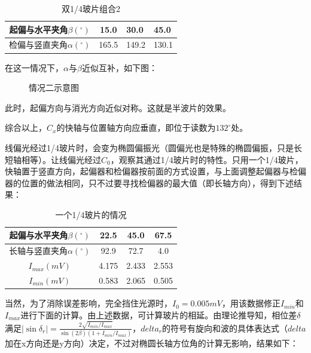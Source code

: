 \documentclass[12pt]{article}
\begin{document}
\begin{table}[H]
    \centering
    \begin{tabular}{|c|c|l|l|}
    \hline
    起偏与水平夹角$\beta (^\circ)$  & 15.0  & 30.0  & 45.0  \\ \hline
    检偏与竖直夹角$\alpha (^\circ)$ & 165.5 & 149.2 & 130.1 \\ \hline
    \end{tabular}
    \caption{双1/4玻片组合2}
    \label{tab:A4}
\end{table}

在这一情况下，$\alpha$与$\beta$近似互补，如下图：

\begin{figure}[H]
    \centering
    
    \caption{情况二示意图}
    \label{fig:3}
\end{figure}

此时，起偏方向与消光方向近似对称。这就是半波片的效果。

综合以上，$C_x$的快轴与位置轴方向应垂直，即位于读数为$132^\circ$处。

线偏光经过1/4玻片时，会变为椭圆偏振光（圆偏光也是特殊的椭圆偏振，只是长短轴相等）。让线偏光经过$C_0$，观察其通过1/4玻片时的特性。只用一个1/4玻片，快轴置于竖直方向，起偏器和检偏器按前面的方式设置，与上面调整起偏器与检偏器的位置的做法相同，只不过要寻找检偏器的最大值（即长轴方向），得到下述结果：

\begin{table}[H]
    \centering
    \begin{tabular}{|c|c|c|c|}
    \hline
    起偏与水平夹角$\beta (^\circ)$  & 22.5  & 45.0  & 67.5  \\ \hline
    长轴与竖直夹角$\alpha (^\circ)$ & 92.9  & 72.7  & 4.0   \\ \hline
    $I_{max}(mV)$            & 4.175 & 2.433 & 2.553 \\ \hline
    $I_{min}(mV)$            & 0.583 & 2.065 & 0.505 \\ \hline
    \end{tabular}
    \caption{一个1/4玻片的情况}
    \label{tab:A5}
\end{table}

当然，为了消除误差影响，完全挡住光源时，$I_0=0.005mV$，用该数据修正$I_{min}$和$I_{max}$进行下面的计算。由上述数据，可计算玻片的相延。由理论推导知，相位差$\delta$满足$|\sin{\delta_r}|=\frac{2\sqrt{I_{min}/I_{max}}}{\sin{(2\beta)}(1+I_{min}/I_{max})}$，$delta_r$的符号有旋向和波的具体表达式（$delta$加在x方向还是y方向）决定，不过对椭圆长轴方位角的计算无影响，结果如下：
\end{document}
